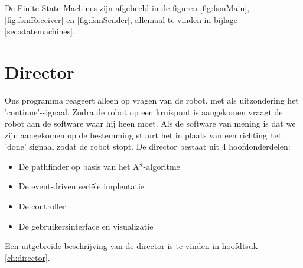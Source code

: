 \documentclass{report}
\begin{document}
De Finite State Machines zijn afgebeeld in de figuren \ref{fig:fsmMain}, \ref{fig:fsmReceiver} en \ref{fig:fsmSender}, allemaal te vinden in bijlage \ref{sec:statemachines}.

\section{Director}
Ons programma reageert alleen op vragen van de robot, met als uitzondering het 'continue'-signaal.
Zodra de robot op een kruispunt is aangekomen vraagt de robot aan de software waar hij heen moet.
Als de software van mening is dat we zijn aangekomen op de bestemming stuurt het in plaats van een richting het 'done' signaal zodat de robot stopt.
De director bestaat uit 4 hoofdonderdelen:

\begin{itemize}
	\item De pathfinder op basis van het A*-algoritme
	\item De event-driven seriële implentatie
	\item De controller
	\item De gebruikersinterface en visualizatie
\end{itemize}

Een uitgebreide beschrijving van de director is te vinden in hoofdtsuk \ref{ch:director}.
\end{document}
